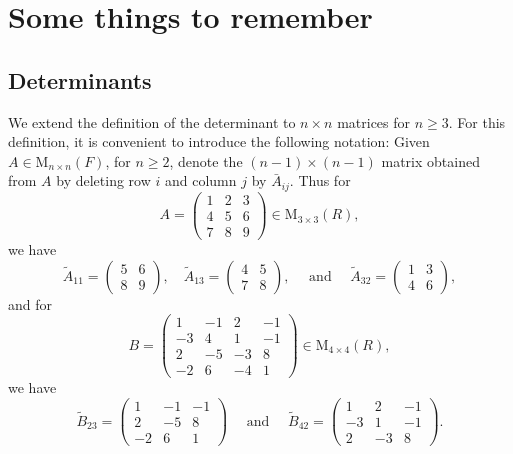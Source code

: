 \documentclass{report}
\begin{document}
    \tableofcontents
    \chapter{Some things to remember}
    \section{Determinants}
    We extend the definition of the determinant to $n \times n$ matrices for $n \geq 3$. For this definition, it is convenient to introduce the following notation: Given $A \in \mathrm{M}_{n \times n}(F)$, for $n \geq 2$, denote the $(n-1) \times(n-1)$ matrix obtained from $A$ by deleting row $i$ and column $j$ by $\bar{A}_{i j}$. Thus for
    $$
    A=\left(\begin{array}{lll}
    1 & 2 & 3 \\
    4 & 5 & 6 \\
    7 & 8 & 9
    \end{array}\right) \in \mathrm{M}_{3 \times 3}(R),
    $$
    we have
    $$
    \tilde{A}_{11}=\left(\begin{array}{ll}
    5 & 6 \\
    8 & 9
    \end{array}\right), \quad \tilde{A}_{13}=\left(\begin{array}{ll}
    4 & 5 \\
    7 & 8
    \end{array}\right), \quad \text { and } \quad \tilde{A}_{32}=\left(\begin{array}{ll}
    1 & 3 \\
    4 & 6
    \end{array}\right),
    $$
    and for
    $$
    B=\left(\begin{array}{rrrr}
    1 & -1 & 2 & -1 \\
    -3 & 4 & 1 & -1 \\
    2 & -5 & -3 & 8 \\
    -2 & 6 & -4 & 1
    \end{array}\right) \in \mathrm{M}_{4 \times 4}(R),
    $$
    we have
    $$
    \tilde{B}_{23}=\left(\begin{array}{rrr}
    1 & -1 & -1 \\
    2 & -5 & 8 \\
    -2 & 6 & 1
    \end{array}\right) \quad \text { and } \quad \tilde{B}_{42}=\left(\begin{array}{rrr}
    1 & 2 & -1 \\
    -3 & 1 & -1 \\
    2 & -3 & 8
    \end{array}\right) .
    $$
\end{document}
